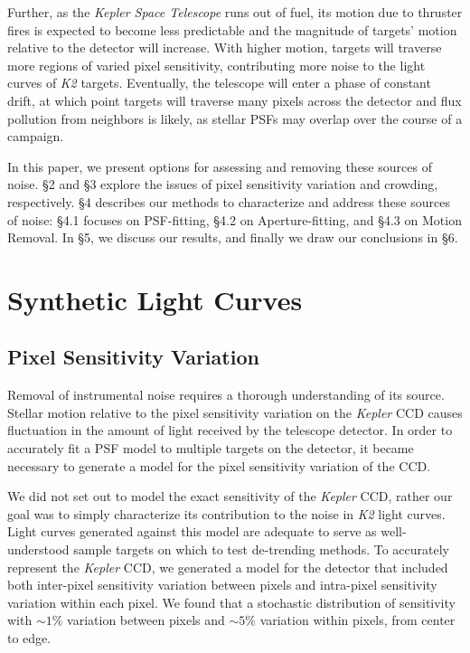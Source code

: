 \documentclass[12pt,preprint]{aastex}
\begin{document}
Further, as the \textit{Kepler Space Telescope} runs out of fuel, its motion due to thruster fires is expected to become less predictable and the magnitude of targets' motion relative to the detector will increase. With higher motion, targets will traverse more regions of varied pixel sensitivity, contributing more noise to the light curves of \textit{K2} targets. Eventually, the telescope will enter a phase of constant drift, at which point targets will traverse many pixels across the detector and flux pollution from neighbors is likely, as stellar PSFs may overlap over the course of a campaign.

In this paper, we present options for assessing and removing these sources of noise. \S 2 and \S 3 explore the issues of pixel sensitivity variation and crowding, respectively. \S 4 describes our methods to characterize and address these sources of noise: \S 4.1 focuses on PSF-fitting, \S 4.2 on Aperture-fitting, and \S 4.3 on Motion Removal. In \S 5, we discuss our results, and finally we draw our conclusions in \S 6.

\section{Synthetic Light Curves}

\subsection{Pixel Sensitivity Variation}

Removal of instrumental noise requires a thorough understanding of its source. Stellar motion relative to the pixel sensitivity variation on the \textit{Kepler} CCD causes fluctuation in the amount of light received by the telescope detector. In order to accurately fit a PSF model to multiple targets on the detector, it became necessary to generate a model for the pixel sensitivity variation of the CCD.

We did not set out to model the exact sensitivity of the \textit{Kepler} CCD, rather our goal was to simply characterize its contribution to the noise in \textit{K2} light curves. Light curves generated against this model are adequate to serve as well-understood sample targets on which to test de-trending methods. To accurately represent the \textit{Kepler} CCD, we generated a model for the detector that included both inter-pixel sensitivity variation between pixels and intra-pixel sensitivity variation within each pixel. We found that a stochastic distribution of sensitivity with ${\sim}1\%$ variation between pixels and ${\sim}5\%$ variation within pixels, from center to edge.
\end{document}
